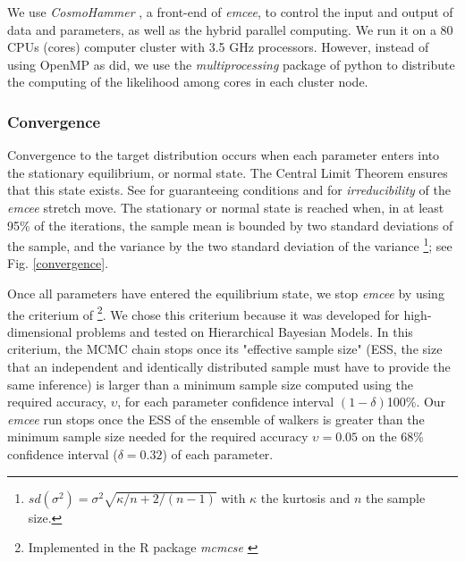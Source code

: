 We use \emph{CosmoHammer} \citep{Akeret2013}, a front-end of \emph{emcee}, to control the input and output of data and parameters, as well as the hybrid parallel computing. We run it on a 80 CPUs (cores) computer cluster with 3.5 GHz processors. However, instead of using OpenMP as \citep{Akeret2013} did, we use the \emph{multiprocessing} package of python to distribute the computing of the likelihood among cores in each cluster node. 

\subsubsection{Convergence}


Convergence to the target distribution occurs when each parameter enters into the stationary equilibrium, or normal state. The Central Limit Theorem ensures that this state exists. See \citet{Roberts2004} for guaranteeing conditions and \citet{Goodman2010} for \emph{irreducibility} of the \emph{emcee} stretch move. The stationary or normal state is reached when, in at least 95\% of the iterations, the sample mean is bounded by two standard deviations of the sample, and the variance by the two standard deviation of the variance \footnote{
$sd(\sigma^2)=\sigma^2 \sqrt{\kappa/n + 2/(n-1)}$ with $\kappa$ the kurtosis and $n$ the sample size.
}; see Fig. \ref{convergence}.
\begin{figure*}[htbp]
\begin{center}
\caption{Normalised mean (left panel) and variance (right panel) of each parameter in our model, as functions of iterations. The normalisation values are the mean and variance of the ensemble of particles positions at the last iteration. Red lines show one and two sigma levels of these normalisation values.}
\label{convergence}
\end{center}
\end{figure*}

Once all parameters have entered the equilibrium state, we stop \emph{emcee} by using the criterium of \citet{Gong2016} \footnote{Implemented in the R package \emph{mcmcse} \citep{mcmcse}}. We chose this criterium because it was developed for high-dimensional problems and tested on Hierarchical Bayesian Models. In this criterium, the MCMC chain stops once its "effective sample size" (ESS, the size that an independent and identically distributed sample must have to provide the same inference) is larger than a minimum sample size computed using the required accuracy, $\upsilon$, for each parameter confidence interval $(1-\delta)$100\%. Our \emph{emcee} run stops once the ESS of the ensemble of walkers is greater than the minimum sample size needed for the required accuracy $\upsilon = 0.05$ on the 68\% confidence interval ($\delta = 0.32$) of each parameter.

